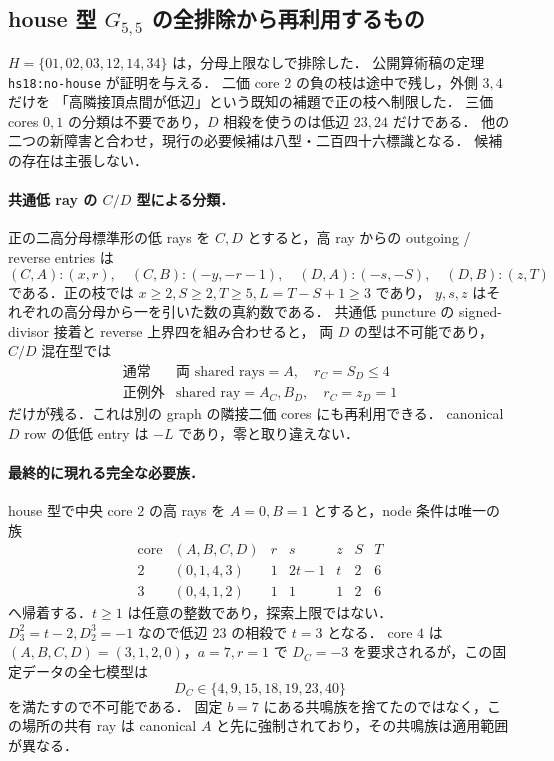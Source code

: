 \subsection{house 型 \texorpdfstring{$G_{5,5}$}{G5,5} の全排除から再利用するもの}
\label{nh18:house}

$H=\{01,02,03,12,14,34\}$ は，分母上限なしで排除した．
公開算術稿の定理 \texttt{hs18:no-house} が証明を与える．
二価 core $2$ の負の枝は途中で残し，外側 $3,4$ だけを
「高隣接頂点間が低辺」という既知の補題で正の枝へ制限した．
三価 cores $0,1$ の分類は不要であり，$D$ 相殺を使うのは低辺 $23,24$ だけである．
他の二つの新障害と合わせ，現行の必要候補は八型・二百四十六標識となる．
候補の存在は主張しない．

\paragraph{共通低 ray の $C/D$ 型による分類．}
正の二高分母標準形の低 rays を $C,D$ とすると，高 ray からの
outgoing / reverse entries は
\[
 (C,A):(x,r),\quad(C,B):(-y,-r-1),\quad
 (D,A):(-s,-S),\quad(D,B):(z,T)
\]
である．正の枝では $x\ge2,S\ge2,T\ge5,L=T-S+1\ge3$ であり，
$y,s,z$ はそれぞれの高分母から一を引いた数の真約数である．
共通低 puncture の signed-divisor 接着と reverse 上界四を組み合わせると，
両 $D$ の型は不可能であり，$C/D$ 混在型では
\[
 \begin{array}{c|c}
 \text{通常}&\text{両 shared rays}=A,\quad r_C=S_D\le4\\
 \text{正例外}&\text{shared ray}=A_C,B_D,\quad r_C=z_D=1
 \end{array}
\]
だけが残る．これは別の graph の隣接二価 cores にも再利用できる．
canonical $D$ row の低低 entry は $-L$ であり，零と取り違えない．

\paragraph{最終的に現れる完全な必要族．}
house 型で中央 core $2$ の高 rays を $A=0,B=1$ とすると，node 条件は唯一の族
\[
 \begin{array}{c|c|ccccc}
 \text{core}&(A,B,C,D)&r&s&z&S&T\\\hline
 2&(0,1,4,3)&1&2t-1&t&2&6\\
 3&(0,4,1,2)&1&1&1&2&6
 \end{array}
\]
へ帰着する．$t\ge1$ は任意の整数であり，探索上限ではない．
$D^2_3=t-2,D^3_2=-1$ なので低辺 $23$ の相殺で $t=3$ となる．
core $4$ は $(A,B,C,D)=(3,1,2,0)$，$a=7,r=1$ で
$D_C=-3$ を要求されるが，この固定データの全七模型は
\[
 D_C\in\{4,9,15,18,19,23,40\}
\]
を満たすので不可能である．
固定 $b=7$ にある共鳴族を捨てたのではなく，この場所の共有 ray は
canonical $A$ と先に強制されており，その共鳴族は適用範囲が異なる．

